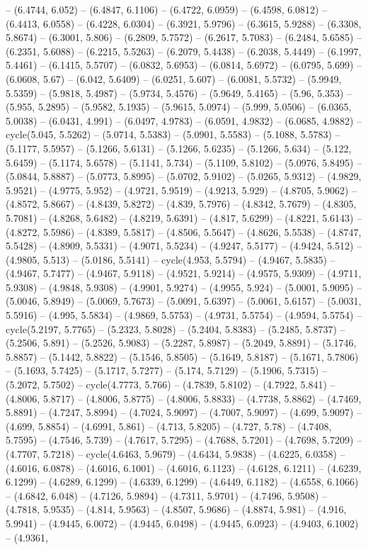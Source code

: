 -- (6.4744, 6.052) -- (6.4847, 6.1106) -- (6.4722, 6.0959) -- (6.4598, 6.0812) -- (6.4413, 6.0558) -- (6.4228, 6.0304) -- (6.3921, 5.9796) -- (6.3615, 5.9288) -- (6.3308, 5.8674) -- (6.3001, 5.806) -- (6.2809, 5.7572) -- (6.2617, 5.7083) -- (6.2484, 5.6585) -- (6.2351, 5.6088) -- (6.2215, 5.5263) -- (6.2079, 5.4438) -- (6.2038, 5.4449) -- (6.1997, 5.4461) -- (6.1415, 5.5707) -- (6.0832, 5.6953) -- (6.0814, 5.6972) -- (6.0795, 5.699) -- (6.0608, 5.67) -- (6.042, 5.6409) -- (6.0251, 5.607) -- (6.0081, 5.5732) -- (5.9949, 5.5359) -- (5.9818, 5.4987) -- (5.9734, 5.4576) -- (5.9649, 5.4165) -- (5.96, 5.353) -- (5.955, 5.2895) -- (5.9582, 5.1935) -- (5.9615, 5.0974) -- (5.999, 5.0506) -- (6.0365, 5.0038) -- (6.0431, 4.991) -- (6.0497, 4.9783) -- (6.0591, 4.9832) -- (6.0685, 4.9882) -- cycle(5.045, 5.5262) -- (5.0714, 5.5383) -- (5.0901, 5.5583) -- (5.1088, 5.5783) -- (5.1177, 5.5957) -- (5.1266, 5.6131) -- (5.1266, 5.6235) -- (5.1266, 5.634) -- (5.122, 5.6459) -- (5.1174, 5.6578) -- (5.1141, 5.734) -- (5.1109, 5.8102) -- (5.0976, 5.8495) -- (5.0844, 5.8887) -- (5.0773, 5.8995) -- (5.0702, 5.9102) -- (5.0265, 5.9312) -- (4.9829, 5.9521) -- (4.9775, 5.952) -- (4.9721, 5.9519) -- (4.9213, 5.929) -- (4.8705, 5.9062) -- (4.8572, 5.8667) -- (4.8439, 5.8272) -- (4.839, 5.7976) -- (4.8342, 5.7679) -- (4.8305, 5.7081) -- (4.8268, 5.6482) -- (4.8219, 5.6391) -- (4.817, 5.6299) -- (4.8221, 5.6143) -- (4.8272, 5.5986) -- (4.8389, 5.5817) -- (4.8506, 5.5647) -- (4.8626, 5.5538) -- (4.8747, 5.5428) -- (4.8909, 5.5331) -- (4.9071, 5.5234) -- (4.9247, 5.5177) -- (4.9424, 5.512) -- (4.9805, 5.513) -- (5.0186, 5.5141) -- cycle(4.953, 5.5794) -- (4.9467, 5.5835) -- (4.9467, 5.7477) -- (4.9467, 5.9118) -- (4.9521, 5.9214) -- (4.9575, 5.9309) -- (4.9711, 5.9308) -- (4.9848, 5.9308) -- (4.9901, 5.9274) -- (4.9955, 5.924) -- (5.0001, 5.9095) -- (5.0046, 5.8949) -- (5.0069, 5.7673) -- (5.0091, 5.6397) -- (5.0061, 5.6157) -- (5.0031, 5.5916) -- (4.995, 5.5834) -- (4.9869, 5.5753) -- (4.9731, 5.5754) -- (4.9594, 5.5754) -- cycle(5.2197, 5.7765) -- (5.2323, 5.8028) -- (5.2404, 5.8383) -- (5.2485, 5.8737) -- (5.2506, 5.891) -- (5.2526, 5.9083) -- (5.2287, 5.8987) -- (5.2049, 5.8891) -- (5.1746, 5.8857) -- (5.1442, 5.8822) -- (5.1546, 5.8505) -- (5.1649, 5.8187) -- (5.1671, 5.7806) -- (5.1693, 5.7425) -- (5.1717, 5.7277) -- (5.174, 5.7129) -- (5.1906, 5.7315) -- (5.2072, 5.7502) -- cycle(4.7773, 5.766) -- (4.7839, 5.8102) -- (4.7922, 5.841) -- (4.8006, 5.8717) -- (4.8006, 5.8775) -- (4.8006, 5.8833) -- (4.7738, 5.8862) -- (4.7469, 5.8891) -- (4.7247, 5.8994) -- (4.7024, 5.9097) -- (4.7007, 5.9097) -- (4.699, 5.9097) -- (4.699, 5.8854) -- (4.6991, 5.861) -- (4.713, 5.8205) -- (4.727, 5.78) -- (4.7408, 5.7595) -- (4.7546, 5.739) -- (4.7617, 5.7295) -- (4.7688, 5.7201) -- (4.7698, 5.7209) -- (4.7707, 5.7218) -- cycle(4.6463, 5.9679) -- (4.6434, 5.9838) -- (4.6225, 6.0358) -- (4.6016, 6.0878) -- (4.6016, 6.1001) -- (4.6016, 6.1123) -- (4.6128, 6.1211) -- (4.6239, 6.1299) -- (4.6289, 6.1299) -- (4.6339, 6.1299) -- (4.6449, 6.1182) -- (4.6558, 6.1066) -- (4.6842, 6.048) -- (4.7126, 5.9894) -- (4.7311, 5.9701) -- (4.7496, 5.9508) -- (4.7818, 5.9535) -- (4.814, 5.9563) -- (4.8507, 5.9686) -- (4.8874, 5.981) -- (4.916, 5.9941) -- (4.9445, 6.0072) -- (4.9445, 6.0498) -- (4.9445, 6.0923) -- (4.9403, 6.1002) -- (4.9361, 